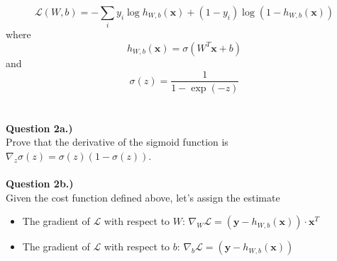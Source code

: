\documentclass[paper=a4, fontsize=11pt]{scrartcl} %
\begin{document}
\begin{equation}
    \mathcal{L}(W, b) = -\sum_i y_i \log{ h_{W,b}(\textbf{x}) } + (1 - y_i) \log{( 1 - h_{W,b}(\textbf{x})) } \nonumber
\end{equation}
where 
\begin{equation}
h_{W,b}(\textbf{x}) = \sigma \left( W^T\textbf{x} + b \right) \nonumber
\end{equation}
and
\begin{equation}
\sigma(z) = \frac{1}{1 - \exp(-z)} \nonumber
\end{equation} \\
\\
{\Large \textbf{Question 2a.)}} \\
Prove that the derivative of the sigmoid function is $\nabla_z \sigma(z) = \sigma(z) \left(1 - \sigma(z)\right)$. \\
\\
{\Large \textbf{Question 2b.)}} \\

Given the cost function defined above, let's assign the estimate

\begin{itemize}
    \item The gradient of $\mathcal{L}$ with respect to $W$: $\nabla_W \mathcal{L} = \left(\textbf{y} - h_{W,b}(\textbf{x}) \right) \cdot \textbf{x}^T$
    \item The gradient of $\mathcal{L}$ with respect to $b$: $\nabla_b \mathcal{L} = \left(\textbf{y} - h_{W,b}(\textbf{x}) \right)$
\end{itemize}
\end{document}
